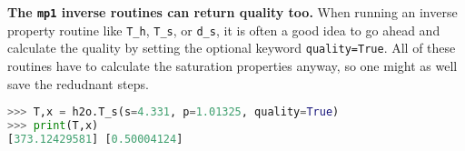 {\bf The \texttt{mp1} inverse routines can return quality too.}  When running an inverse property routine like \verb|T_h|, \verb|T_s|, or \verb|d_s|, it is often a good idea to go ahead and calculate the quality by setting the optional keyword \verb|quality=True|.  All of these routines have to calculate the saturation properties anyway, so one might as well save the redudnant steps.
\begin{lstlisting}[language=Python]
>>> T,x = h2o.T_s(s=4.331, p=1.01325, quality=True)
>>> print(T,x)
[373.12429581] [0.50004124]
\end{lstlisting}
